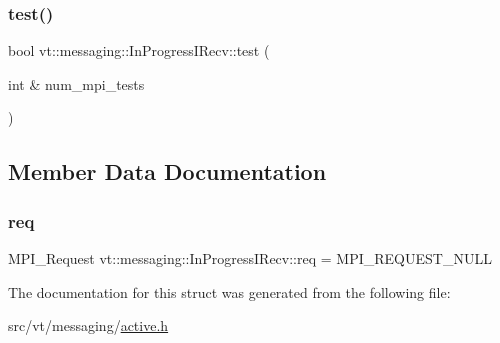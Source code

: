 \subsubsection{\texorpdfstring{test()}{test()}}
{\footnotesize\ttfamily bool vt\+::messaging\+::\+In\+Progress\+I\+Recv\+::test (\begin{DoxyParamCaption}\item[{int \&}]{num\+\_\+mpi\+\_\+tests }\end{DoxyParamCaption})\hspace{0.3cm}{\ttfamily [inline]}}



\subsection{Member Data Documentation}
\mbox{\label{structvt_1_1messaging_1_1_in_progress_i_recv_af1ee8d3168a064aa7749b986439b81e8}} 
\subsubsection{\texorpdfstring{req}{req}}
{\footnotesize\ttfamily M\+P\+I\+\_\+\+Request vt\+::messaging\+::\+In\+Progress\+I\+Recv\+::req = M\+P\+I\+\_\+\+R\+E\+Q\+U\+E\+S\+T\+\_\+\+N\+U\+LL\hspace{0.3cm}{\ttfamily [private]}}



The documentation for this struct was generated from the following file\+:\begin{DoxyCompactItemize}
\item 
src/vt/messaging/\hyperlink{active_8h}{active.\+h}\end{DoxyCompactItemize}
